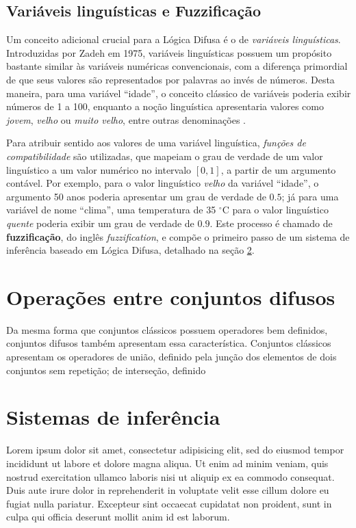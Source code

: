 \documentclass[12pt]{article}
\begin{document}
\subsection{Variáveis linguísticas e Fuzzificação}

Um conceito adicional crucial para a Lógica Difusa é o de \textit{variáveis linguísticas}. Introduzidas por Zadeh em 1975, variáveis linguísticas possuem um propósito bastante similar às variáveis numéricas convencionais, com a diferença primordial de que seus valores são representados por palavras ao invés de números. Desta maneira, para uma variável ``idade'', o conceito clássico de variáveis poderia exibir números de 1 a 100, enquanto a noção linguística apresentaria valores como \textit{jovem}, \textit{velho} ou \textit{muito velho}, entre outras denominações \cite{Zadeh1975}.

Para atribuir sentido aos valores de uma variável linguística, \textit{funções de compatibilidade} são utilizadas, que mapeiam o grau de verdade de um valor linguístico a um valor numérico no intervalo $[0, 1]$, a partir de um argumento contável. Por exemplo, para o valor linguístico \textit{velho} da variável ``idade'', o argumento 50 anos poderia apresentar um grau de verdade de $0.5$; já para uma variável de nome ``clima'', uma temperatura de 35 $^{\circ}$C para o valor linguístico \textit{quente} poderia exibir um grau de verdade de $0.9$. Este processo é chamado de \textbf{fuzzificação}, do inglês \textit{fuzzification}, e compõe o primeiro passo de um sistema de inferência baseado em Lógica Difusa, detalhado na seção \ref{sec:inference}.

\section{Operações entre conjuntos difusos} \label{sec:operations}

Da mesma forma que conjuntos clássicos possuem operadores bem definidos, conjuntos difusos também apresentam essa característica. Conjuntos clássicos apresentam os operadores de união, definido pela junção dos elementos de dois conjuntos sem repetição; de interseção, definido  

\section{Sistemas de inferência} \label{sec:inference}

Lorem ipsum dolor sit amet, consectetur adipisicing elit, sed do eiusmod tempor incididunt ut labore et dolore magna aliqua. Ut enim ad minim veniam, quis nostrud exercitation ullamco laboris nisi ut aliquip ex ea commodo consequat. Duis aute irure dolor in reprehenderit in voluptate velit esse cillum dolore eu fugiat nulla pariatur. Excepteur sint occaecat cupidatat non proident, sunt in culpa qui officia deserunt mollit anim id est laborum.
\end{document}
